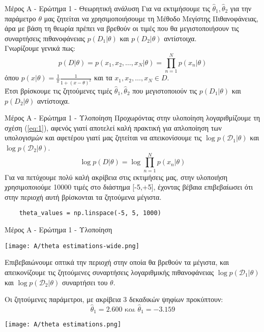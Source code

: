 \documentclass{beamer}
\begin{document}
\begin{frame}{Μέρος Α - Ερώτημα 1 - Θεωρητική ανάλυση}
    Για να εκτιμήσουμε τις $\hat{\theta}_1, \hat{\theta}_2$ για την παράμετρο $\theta$ μας ζητείται να χρησιμοποιήσουμε τη Μέθοδο Μεγίστης Πιθανοφάνειας, άρα με βάση τη θεωρία πρέπει να βρεθούν οι τιμές που θα μεγιστοποιήσουν τις συναρτήσεις πιθανοφάνειας $p(D_1|\theta)$ και $p(D_2|\theta)$ αντίστοιχα.\\
    Γνωρίζουμε γενικά πως:
    \begin{equation} p(D|\theta) = p(x_1, x_2, \dots, x_N | \theta) = \prod_{n=1}^N p(x_n | \theta)     \label{eq:1}
\end{equation}
    όπου $p(x|\theta) = \frac{1}{\pi} \frac{1}{1+(x-\theta)^2}$ και τα $x_1, x_2, \dots, x_N \in D$.\\
    Έτσι βρίσκουμε τις ζητούμενες τιμές $\hat{\theta}_1, \hat{\theta}_2$ που μεγιστοποιούν τις $p(D_1|\theta)$ και $p(D_2|\theta)$ αντίστοιχα.
\end{frame}

\begin{frame}[fragile]{Μέρος Α - Ερώτημα 1 - Υλοποίηση}
    Προχωρόντας στην υλοποίηση λογαριθμίζουμε τη σχέση (\ref{eq:1}), αφενός γιατί αποτελεί καλή πρακτική για απλοποίηση των υπολογισμών και αφετέρου γιατί μας ζητείται να απεικονίσουμε τις $\log p(\mathcal{D}_1 | \theta)$ και $\log p(\mathcal{D}_2 | \theta)$.
    $$\log p(D|\theta) = \log \prod_{n=1}^N p(x_n | \theta)$$
    Για να πετύχουμε πολύ καλή ακρίβεια στις εκτιμήσεις μας, στην υλοποιήση χρησιμοποιούμε 10000 τιμές στο διάστημα [-5,+5], έχοντας βέβαια επιβεβαίωσει ότι στην περιοχή αυτή βρίσκονται τα ζητούμενα μέγιστα.
     \lstset{style=python}
\begin{lstlisting}
    theta_values = np.linspace(-5, 5, 1000)
\end{lstlisting}
\end{frame}

\begin{frame}{Μέρος Α - Ερώτημα 1 - Υλοποίηση}

\begin{minipage}{0.47\textwidth}
    \texttt{[image: A/theta estimations-wide.png]}
\end{minipage}
\hfill
\begin{minipage}{0.5\textwidth}
Επιβεβαιώνουμε οπτικά την περιοχή στην οποία θα βρεθούν τα μέγιστα, και απεικονίζουμε τις ζητούμενες συναρτήσεις λογαριθμικής πιθανοφάνειας $\log p(\mathcal{D}_1 | \theta)$ και $\log p(\mathcal{D}_2 | \theta)$ συναρτήσει του $\theta$.
\end{minipage}
\vspace{0.5cm} %
\begin{minipage}{0.39\textwidth}
Οι ζητούμενες παράμετροι, με ακρίβεια 3 δεκαδικών ψηφίων προκύπτουν:
$$\hat{\theta}_1 = 2.600 \text{ και } \hat{\theta}_1 = -3.159$$
\end{minipage}
\hfill
\begin{minipage}{0.6\textwidth}
    \texttt{[image: A/theta estimations.png]}
\end{minipage}
\end{frame}
\end{document}
